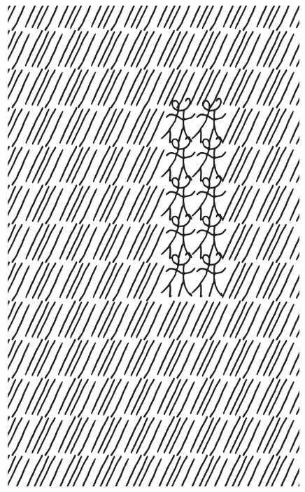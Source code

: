 \makeatletter\@openrightfalse
\movetooddpage
\begin{absolutelynopagebreak}
\begin{vplace}
\begin{figure}[H]
\begin{adjustwidth}{-0.99cm}{}
  \centering
  \vspace*{-1.77cm}
  \hspace*{-0.15cm}
  \includegraphics[width=111mm]{./imgs/img3.pdf}  
  \hfill
\end{adjustwidth}

\thispagestyle{empty}

\end{figure}
\end{vplace}

\end{absolutelynopagebreak}

